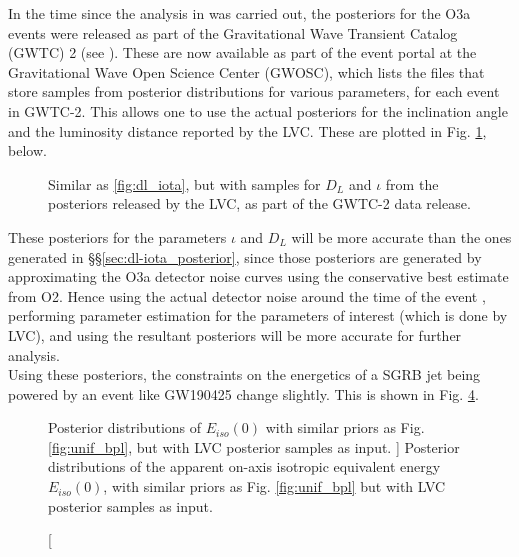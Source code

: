     In the time since the analysis in \cite{saleem_2020B} was carried out, the
    posteriors for the O3a events were released as part of the Gravitational Wave
    Transient Catalog (GWTC) 2 (see \cite{abbott_2020A}). These are now available as
    part of the event portal at the Gravitational Wave Open Science Center (GWOSC),
    which lists the files that store samples from posterior distributions for various
    parameters, for each event in GWTC-2. This allows one to use the actual posteriors
    for the inclination angle and the luminosity distance reported by the LVC. These are
    plotted in Fig. \ref{fig:dl-iota_post_updated}, below.\\

    \begin{figure}[H]
        \centering
        \def\svgwidth{\textwidth}
        
        \caption[$D_L-\iota$ posterior, with samples from the data released by LVC.]
        {
            Similar as \ref{fig:dl_iota}, but with samples for $D_L$ and $\iota$ from
            the posteriors released by the LVC, as part of the GWTC-2 data release.
        }
        \label{fig:dl-iota_post_updated}
    \end{figure}

    These posteriors for the parameters $\iota$ and $D_L$ will be more accurate than the
    ones generated in \S\S\ref{sec:dl-iota_posterior}, since those posteriors are
    generated by approximating the O3a detector noise curves using the conservative best
    estimate from O2. Hence using the actual detector noise around the time of the event
    , performing parameter estimation for the parameters of interest (which is done by
    LVC), and using the resultant posteriors will be more accurate for further
    analysis.\\
    Using these posteriors, the constraints on the energetics of a SGRB jet
    being powered by an event like GW190425 change slightly. This is shown in Fig.
    \ref{fig:unif_bpl_updated}.

    \begin{figure}[H]
        \begin{subfigure}{0.5\textwidth}
              \label{fig:unif_updated}
              \centering
              \def\svgwidth{\textwidth}
              
        \end{subfigure}%
        \begin{subfigure}{0.5\textwidth}
              \label{fig:bpl_updated}
              \centering
              \def\svgwidth{\textwidth}
              
        \end{subfigure}
        \caption
        [
            Posterior distributions of $E_{iso}(0)$ with similar priors as Fig.
            \ref{fig:unif_bpl}, but with LVC posterior samples as input.
        ]
        {
            Posterior distributions of the apparent on-axis isotropic equivalent energy
            $E_{iso}(0)$, with similar priors as Fig. \ref{fig:unif_bpl} but with LVC
            posterior samples as input.
        }
        \label{fig:unif_bpl_updated}
    \end{figure}

